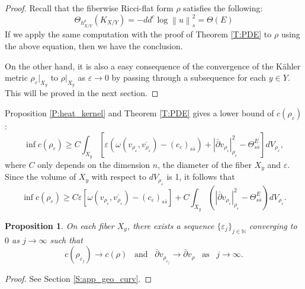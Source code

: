 \documentclass{amsart}
\newtheorem{proposition}[theorem]{Proposition}
\theoremstyle{definition}
\numberwithin{equation}{section}
\begin{document}
\begin{proof}
Recall that the fiberwise Ricci-flat form $\rho$ satisfies the following:
\begin{equation*} 
\Theta_{h^\rho_{X/Y}}(K_{X/Y})
=
-dd^c\log{\left\|{u}\right\|}_s^2
=
\Theta(E)
\end{equation*}
If we apply the same computation with the proof of Theorem \ref{T:PDE} to $\rho$ using the above equation, then we have the conclusion.

On the other hand, it is also a easy consequence of the convergence of the K\"ahler metric $\rho_{\varepsilon}\vert_{X_y}$ to $\rho\vert_{X_y}$ as ${\varepsilon}\rightarrow0$ by passing through a subsequence for each $y\in Y$. This will be proved in the next section.
\end{proof}

Proposition \ref{P:heat_kernel} and Theorem \ref{T:PDE} gives a lower bound of $c(\rho_{\varepsilon})$:
\begin{equation*}
\inf c(\rho_\varepsilon)
\ge
C\int_{X_y}
{\left[{
	{\varepsilon}{\left({\omega(v_{\rho_{\varepsilon}},\overline{v_{\rho_{\varepsilon}}})
	-(c_{\varepsilon})_{s\bar s}
	}\right)}
	+{\left\vert{\bar\partial v_{\rho_{\varepsilon}}}\right\vert}_{\rho_{\varepsilon}}^2
	-\Theta^E_{s\bar s}
}\right]}
dV_{\rho_\varepsilon},
\end{equation*}
where $C$ only depends on the dimension $n$, the diameter of the fiber $X_y$  and $\varepsilon$. Since the volume of $X_y$ with respect to $dV_{\rho_{\varepsilon}}$ is 1, it follows that
\begin{equation}
\inf c(\rho_\varepsilon)
\ge
C{\varepsilon}{\left[{\omega(v_{\rho_{\varepsilon}},\overline{v_{\rho_{\varepsilon}}})
		-(c_{\varepsilon})_{s\bar s}
	}\right]}
	+
	C\int_{X_y}{\left({
		{\left\vert{\bar\partial v_{\rho_{\varepsilon}}}\right\vert}_{\rho_{\varepsilon}}^2
		-\Theta^E_{s\bar s}
	}\right)}
dV_{\rho_\varepsilon}.
\end{equation}
\begin{proposition} \label{P:conv_geo_curv}
On each fiber $X_y$, there exists a sequence $\{{\varepsilon}_j\}_{j\in{\mathbb{N}}}$ converging to $0$ as $j\rightarrow\infty$ such that
\begin{equation*}
c(\rho_{{\varepsilon}_j})\rightarrow c(\rho)
\;\;\;\text{and}\;\;\;
\bar\partial v_{\rho_{{\varepsilon}_j}}
\rightarrow
\bar\partial v_{\rho}
\;\;\;\text{as}\;\;\;
j\rightarrow\infty.
\end{equation*}
\end{proposition}
\begin{proof}
See Section \ref{S:app_geo_curv}.
\end{proof}
\end{document}
